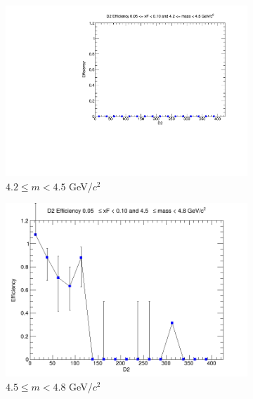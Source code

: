 \documentclass[11pt]{article}
\begin{document}
\begin{figure}[p]
    \centering
    \begin{subfigure}[b]{0.32\textwidth}
        \centering
        \includegraphics[width=\textwidth]{./kTrackerEfficiencyPlots/D2_Efficiency_xF1_mass0.pdf}
        \caption{$4.2 \leq m < 4.5$ GeV/$c^2$}
    \end{subfigure}\hfill
    \begin{subfigure}[b]{0.32\textwidth}
        \centering
        \includegraphics[width=\textwidth]{./kTrackerEfficiencyPlots/D2_Efficiency_xF1_mass1.png}
        \caption{$4.5 \leq m < 4.8$ GeV/$c^2$}
    \end{subfigure}\hfill
    \begin{subfigure}[b]{0.32\textwidth}
        \centering

\end{subfigure}
\end{figure}
\end{document}
